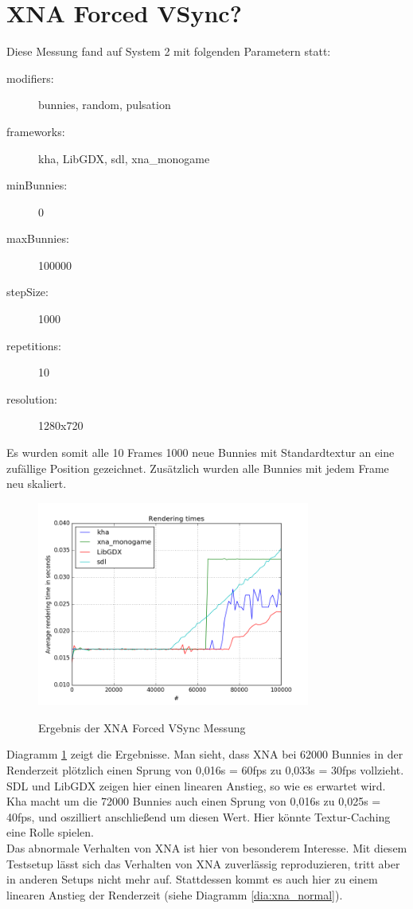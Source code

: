 \section{XNA Forced VSync?}
Diese Messung fand auf System 2 mit folgenden Parametern statt:
\begin{description}
\item[modifiers:] bunnies, random, pulsation
\item[frameworks:] kha, LibGDX, sdl, xna\_monogame
\item[minBunnies:] 0
\item[maxBunnies:] 100000
\item[stepSize:] 1000
\item[repetitions:] 10
\item[resolution:] 1280x720
\end{description}
Es wurden somit alle 10 Frames 1000 neue Bunnies mit Standardtextur an eine zufällige Position gezeichnet. Zusätzlich wurden alle Bunnies mit jedem Frame neu skaliert.\\ 
\begin{figure}
\caption{Ergebnis der XNA Forced VSync Messung}
\centering
\includegraphics[width=0.8\textwidth]{xna_forced}
\label{dia:xna_forced}
\end{figure}
Diagramm \ref{dia:xna_forced} zeigt die Ergebnisse. Man sieht, dass XNA bei 62000 Bunnies in der Renderzeit plötzlich einen Sprung von 0,016s = 60fps zu 0,033s = 30fps vollzieht. SDL und LibGDX zeigen hier einen linearen Anstieg, so wie es erwartet wird. Kha macht um die 72000 Bunnies auch einen Sprung von 0,016s zu 0,025s = 40fps, und oszilliert anschließend um diesen Wert. Hier könnte Textur-Caching eine Rolle spielen. \\
Das abnormale Verhalten von XNA ist hier von besonderem Interesse. Mit diesem Testsetup lässt sich das Verhalten von XNA zuverlässig reproduzieren, tritt aber in anderen Setups nicht mehr auf. Stattdessen kommt es auch hier zu einem linearen Anstieg der Renderzeit (siehe Diagramm \ref{dia:xna_normal}).
